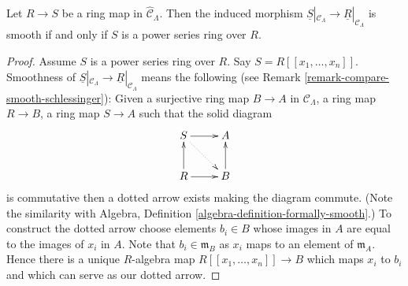 \begin{lemma}
\label{lemma-smooth-morphism-power-series}
Let $R \to S$ be a ring map in $\widehat{\mathcal{C}}_\Lambda$. Then
the induced morphism
$\underline{S}|_{\mathcal{C}_\Lambda} \to \underline{R}|_{\mathcal{C}_\Lambda}$
is smooth if and only if $S$ is a power series ring over $R$.
\end{lemma}

\begin{proof}
Assume $S$ is a power series ring over $R$. Say $S = R[[x_1, \ldots, x_n]]$.
Smoothness of
$\underline{S}|_{\mathcal{C}_\Lambda} \to \underline{R}|_{\mathcal{C}_\Lambda}$
means the following (see Remark \ref{remark-compare-smooth-schlessinger}):
Given a surjective ring map $B \to A$ in
$\mathcal{C}_\Lambda$, a ring map $R \to B$, a ring map $S \to A$ such that
the solid diagram
$$
\xymatrix{
S \ar[r] \ar@{..>}[rd] & A \\
R \ar[u] \ar[r] & B \ar[u]
}
$$
is commutative then a dotted arrow exists making the diagram commute.
(Note the similarity with
Algebra, Definition \ref{algebra-definition-formally-smooth}.)
To construct the dotted arrow choose elements $b_i \in B$ whose images
in $A$ are equal to the images of $x_i$ in $A$. Note that
$b_i \in \mathfrak m_B$ as $x_i$ maps to an element of $\mathfrak m_A$.
Hence there is a unique $R$-algebra map $R[[x_1, \ldots, x_n]] \to B$
which maps $x_i$ to $b_i$ and which can serve as our dotted arrow.


\end{proof}
